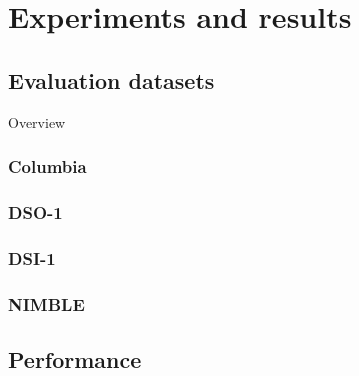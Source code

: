 \chapter{Experiments and results}

\section{Evaluation datasets}

Overview

\subsection{Columbia}

\subsection{DSO-1}

\subsection{DSI-1}

\subsection{NIMBLE}


\section{Performance}
